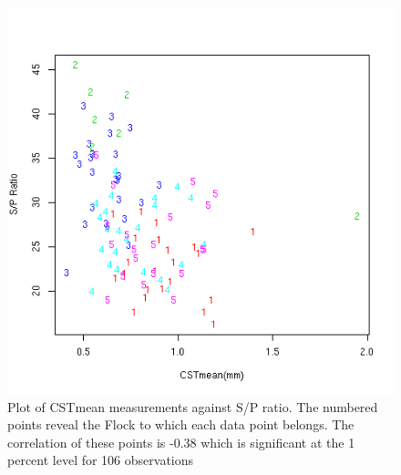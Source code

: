 %

\begin{figure}[!h]
  \centering
  \includegraphics[width=1.0\textwidth]{spcst.png}
  \caption{Plot of CSTmean measurements against S/P ratio. The numbered points reveal the Flock to which each data point belongs. The correlation of these points is -0.38 which is significant at the 1 percent level for 106 observations}
  \label{fig:spcst}
\end{figure}

%

